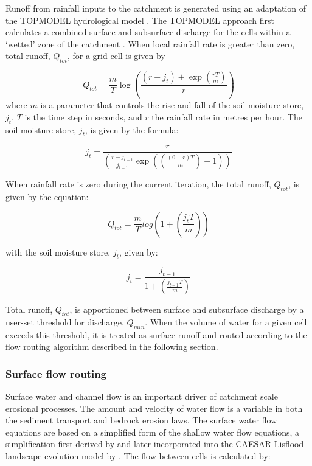 Runoff from rainfall inputs to the catchment is generated using an adaptation of the TOPMODEL hydrological model \citep{beven1979physically}. The TOPMODEL approach first calculates a combined surface and subsurface discharge for the cells within a `wetted' zone of the catchment \citep{coulthard2002cellular}. When local rainfall rate is greater than zero, total runoff, \(Q_{tot}\), for a grid cell is given by 

\begin{equation}
Q_{tot} = \frac{m}{T} \log \left( \frac{(r-j_t) + \exp \left(\frac{rT}{m} \right)}{r} \right)
\end{equation}
where \(m\) is a parameter that controls the rise and fall of the soil moisture store, \(j_t\), \(T\) is the time step in seconds, and \(r\) the rainfall rate in metres per hour. The soil moisture store, \(j_t\), is given by the formula:

\begin{equation}
j_t = \frac{r}  { \left(  \frac{r-j_{t-1}}{j_{t-1}  } \exp \left( \left( \frac{(0-r)T}{m}\right) +1 \right) \right)}
\end{equation}

\noindent
When rainfall rate is zero during the current iteration, the total runoff, \(Q_{tot}\), is given by the equation:

\begin{equation}
Q_{tot} =  \frac{m}{T} log \left( 1 + \left( \frac{j_t  T}{m} \right) \right)
\end{equation}

\noindent
with the soil moisture store, \(j_t\), given by:

\begin{equation}
j_t = \frac{j_{t-1}}{1 + \left( \frac{j_{t-1}T}{m} \right) }
\end{equation}

\noindent
Total runoff, \(Q_{tot}\), is apportioned between surface and subsurface discharge by a user-set threshold for discharge, \(Q_{min}\). When the volume of water for a given cell exceeds this threshold, it is treated as surface runoff and routed according to the flow routing algorithm described in the following section.

%

\subsubsection{Surface flow routing}
Surface water and channel flow is an important driver of catchment scale erosional processes. The amount and velocity of water flow is a variable in both the sediment transport and bedrock erosion laws. The surface water flow equations are based on a simplified form of the shallow water flow equations, a simplification first derived by \citet{bates2010simple} and later incorporated into the CAESAR-Lisflood landscape evolution model by \citet{Coulthard2013}. The flow between cells is calculated by:

